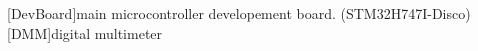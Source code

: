 \begin{acronym}
        [DevBoard]{main microcontroller developement board. (STM32H747I-Disco)}
        [DMM]{digital multimeter}
\end{acronym}